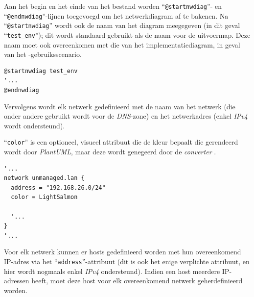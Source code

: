 Aan het begin en het einde van het bestand worden ``\texttt{@startnwdiag}''- en ``\texttt{@endnwdiag}''-lijnen toegevoegd om het netwerkdiagram af te bakenen. Na ``\texttt{@startnwdiag}'' wordt ook de naam van het diagram meegegeven (in dit geval ``\texttt{test\_env}''); dit wordt standaard gebruikt als de naam voor de uitvoermap. Deze naam moet ook overeenkomen met die van het implementatiediagram, in geval van het -gebruiksscenario.

\begin{codeblockfixed}
  \begin{codeblock}
    \begin{lstlisting}[language=plantuml]
@startnwdiag test_env
'...
@endnwdiag
\end{lstlisting}
    \caption[Afbakening van netwerkdiagram]{Afbakening van het netwerkdiagram met ``\texttt{@startnwdiag}'' \& ``\texttt{@endnwdiag}''.}
    \label{code:vb_nwdiag_afbakening}
  \end{codeblock}
\end{codeblockfixed}

Vervolgens wordt elk netwerk gedefinieerd met de naam van het netwerk (die onder andere gebruikt wordt voor de \emph{DNS}-zone) en het netwerkadres (enkel \emph{IPv4} wordt ondersteund).

``\texttt{color}'' is een optioneel, visueel attribuut die de kleur bepaalt die gerendeerd wordt door \emph{PlantUML}, maar deze wordt genegeerd door de \emph{converter} \autocite{PlantUML2026a}.

\begin{codeblockfixed}
  \begin{codeblock}
    \begin{lstlisting}[language=plantuml]
'...
network unmanaged.lan {
  address = "192.168.26.0/24"
  color = LightSalmon

  '...
}
'...
\end{lstlisting}
    \caption[Netwerkdefinitie in netwerkdiagram (\emph{PlantUML})]{Definitie van een netwerk in het netwerkdiagram (met een optioneel ``\texttt{color}''-attribuut) in \emph{PlantUML}.}
    \label{code:vb_nwdiag_network}
  \end{codeblock}
\end{codeblockfixed}

Voor elk netwerk kunnen er hosts gedefinieerd worden met hun overeenkomend IP-adres via het ``\texttt{address}''-attribuut (dit is ook het enige verplichte attribuut, en hier wordt nogmaals enkel \emph{IPv4} ondersteund).
Indien een host meerdere IP-adressen heeft, moet deze host voor elk overeenkomend netwerk geherdefinieerd worden.

